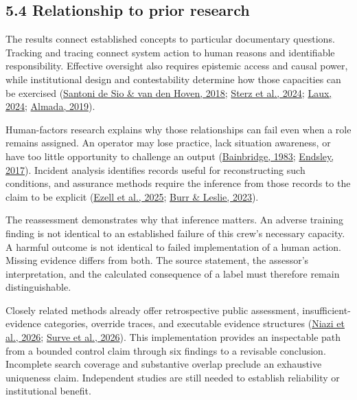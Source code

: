\documentclass[11pt]{article}
\begin{document}
\subsection*{5.4 Relationship to prior research}

The results connect established concepts to particular documentary questions. Tracking and tracing connect system action to human reasons and identifiable responsibility. Effective oversight also requires epistemic access and causal power, while institutional design and contestability determine how those capacities can be exercised (\href{https://doi.org/10.3389/frobt.2018.00015}{Santoni de Sio \& van den Hoven, 2018}; \href{https://doi.org/10.1145/3630106.3659051}{Sterz et al., 2024}; \href{https://doi.org/10.1007/s00146-023-01777-z}{Laux, 2024}; \href{https://doi.org/10.1145/3322640.3326699}{Almada, 2019}).

Human-factors research explains why those relationships can fail even when a role remains assigned. An operator may lose practice, lack situation awareness, or have too little opportunity to challenge an output (\href{https://doi.org/10.1016/0005-1098(83)90046-8}{Bainbridge, 1983}; \href{https://doi.org/10.1177/0018720816681350}{Endsley, 2017}). Incident analysis identifies records useful for reconstructing such conditions, and assurance methods require the inference from those records to the claim to be explicit (\href{https://doi.org/10.1609/aies.v8i1.36596}{Ezell et al., 2025}; \href{https://doi.org/10.1007/s43681-022-00178-0}{Burr \& Leslie, 2023}).

The reassessment demonstrates why that inference matters. An adverse training finding is not identical to an established failure of this crew’s necessary capacity. A harmful outcome is not identical to failed implementation of a human action. Missing evidence differs from both. The source statement, the assessor’s interpretation, and the calculated consequence of a label must therefore remain distinguishable.

Closely related methods already offer retrospective public assessment, insufficient-evidence categories, override traces, and executable evidence structures (\href{https://doi.org/10.3390/automation7030096}{Niazi et al., 2026}; \href{https://doi.org/10.48550/arXiv.2606.21276}{Surve et al., 2026}). This implementation provides an inspectable path from a bounded control claim through six findings to a revisable conclusion. Incomplete search coverage and substantive overlap preclude an exhaustive uniqueness claim. Independent studies are still needed to establish reliability or institutional benefit.
\end{document}
